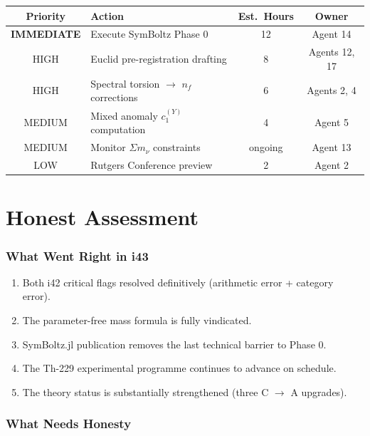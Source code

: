\documentclass[11pt,a4paper]{article}
\begin{document}
\begin{center}
\begin{tabular}{clcc}
\toprule
\textbf{Priority} & \textbf{Action} & \textbf{Est.\ Hours} & \textbf{Owner} \\
\midrule
\textbf{IMMEDIATE} & Execute SymBoltz Phase 0 & 12 & Agent 14 \\
HIGH & Euclid pre-registration drafting & 8 & Agents 12, 17 \\
HIGH & Spectral torsion $\to$ $n_f$ corrections & 6 & Agents 2, 4 \\
MEDIUM & Mixed anomaly $c_1^{(Y)}$ computation & 4 & Agent 5 \\
MEDIUM & Monitor $\Sigma m_\nu$ constraints & ongoing & Agent 13 \\
LOW & Rutgers Conference preview & 2 & Agent 2 \\
\bottomrule
\end{tabular}
\end{center}


\part{Honest Assessment}

\section{What Went Right in i43}

\begin{enumerate}
\item Both i42 critical flags resolved definitively (arithmetic error + category error).
\item The parameter-free mass formula is fully vindicated.
\item SymBoltz.jl publication removes the last technical barrier to Phase 0.
\item The Th-229 experimental programme continues to advance on schedule.
\item The theory status is substantially strengthened (three C $\to$ A upgrades).
\end{enumerate}

\section{What Needs Honesty}
\end{document}
